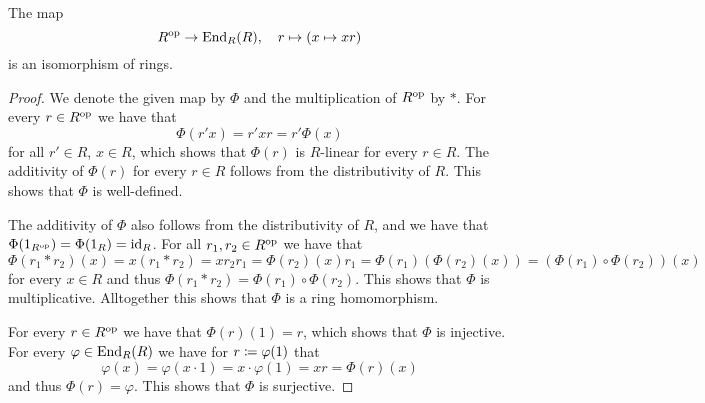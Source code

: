 

\begin{lemma}
  \label{lemma: End_R(R) = Rop}
  The map
  \[
              R^{\mathrm{op}}
    \to       \operatorname{End}_R(R),
    \quad     r
    \mapsto   (x \mapsto xr)
  \]
  is an isomorphism of rings.
\end{lemma}


\begin{proof}
  We denote the given map by $\Phi$ and the multiplication of $R^{\mathrm{op}}$ by $*$.
  For every $r \in R^{\mathrm{op}}$ we have that
  \[
      \Phi(r'x)
    = r' x r
    = r' \Phi(x)
  \]
  for all $r' \in R$, $x \in R$, which shows that $\Phi(r)$ is $R$-linear for every $r \in R$.
  The additivity of $\Phi(r)$ for every $r \in R$ follows from the distributivity of $R$.
  This shows that $\Phi$ is well-defined.
  
  The additivity of $\Phi$ also follows from the distributivity of $R$, and we have that $\Phi(1_{R^{\mathrm{op}}}) = \Phi(1_R) = \operatorname{id}_R$.
  For all $r_1, r_2 \in R^{\mathrm{op}}$ we have that
  \[
      \Phi(r_1 * r_2)(x)
    = x (r_1 * r_2)
    = x r_2 r_1
    = \Phi(r_2)(x) r_1
    = \Phi(r_1)(\Phi(r_2)(x))
    = (\Phi(r_1) \circ \Phi(r_2))(x)
  \]
  for every $x \in R$ and thus $\Phi(r_1 * r_2) = \Phi(r_1) \circ \Phi(r_2)$.
  This shows that $\Phi$ is multiplicative.
  Alltogether this shows that $\Phi$ is a ring homomorphism.
  
  For every $r \in R^{\mathrm{op}}$ we have that $\Phi(r)(1) = r$, which shows that $\Phi$ is injective.
  For every $\varphi \in \operatorname{End}_R(R)$ we have for $r \coloneqq \varphi(1)$ that
  \[
      \varphi(x)
    = \varphi(x \cdot 1)
    = x \cdot \varphi(1)
    = x r
    = \Phi(r)(x)
  \]
  and thus $\Phi(r) = \varphi$.
  This shows that $\Phi$ is surjective.
\end{proof}


